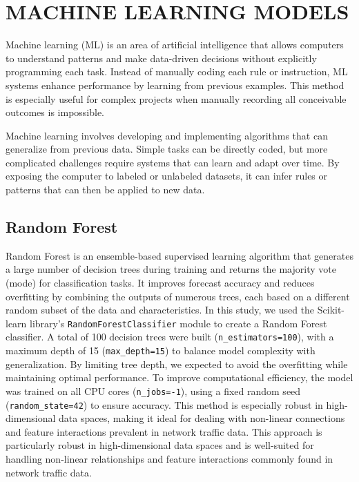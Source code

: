 \documentclass[conference]{IEEEtran}
\begin{document}
\section{MACHINE LEARNING MODELS}

Machine learning (ML) is an area of artificial intelligence that allows computers to understand patterns and make data-driven decisions without explicitly programming each task.  Instead of manually coding each rule or instruction, ML systems enhance performance by learning from previous examples.  This method is especially useful for complex projects when manually recording all conceivable outcomes is impossible.

Machine learning involves developing and implementing algorithms that can generalize from previous data.  Simple tasks can be directly coded, but more complicated challenges require systems that can learn and adapt over time. By exposing the computer to labeled or unlabeled datasets, it can infer rules or patterns that can then be applied to new data.~\cite{7}

\subsection{Random Forest}
Random Forest is an ensemble-based supervised learning algorithm that generates a large number of decision trees during training and returns the majority vote (mode) for classification tasks.  It improves forecast accuracy and reduces overfitting by combining the outputs of numerous trees, each based on a different random subset of the data and characteristics.  In this study, we used the Scikit-learn library's \texttt{RandomForestClassifier} module to create a Random Forest classifier.  A total of 100 decision trees were built (\texttt{n\_estimators=100}), with a maximum depth of 15 (\texttt{max\_depth=15}) to balance model complexity with generalization.  By limiting tree depth, we expected to avoid the overfitting while maintaining optimal performance.  To improve computational efficiency, the model was trained on all CPU cores (\texttt{n\_jobs=-1}), using a fixed random seed (\texttt{random\_state=42}) to ensure accuracy.  This method is especially robust in high-dimensional data spaces, making it ideal for dealing with non-linear connections and feature interactions prevalent in network traffic data. This approach is particularly robust in high-dimensional data spaces and is well-suited for handling non-linear relationships and feature interactions commonly found in network traffic data.
\end{document}
